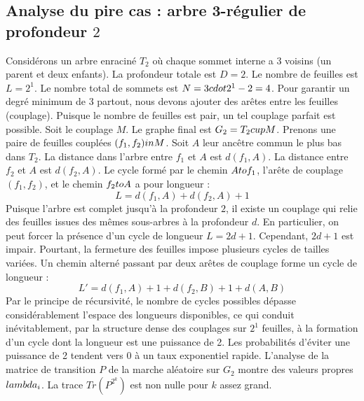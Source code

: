 \documentclass[12pt,a4paper]{article}
\begin{document}
\subsection{Analyse du pire cas : arbre 3-r\'egulier de profondeur $2$}
Consid\'erons un arbre enracin\'e $T_{2}$ o\`u chaque sommet interne a 3 voisins (un parent et deux enfants).
La profondeur totale est $D = 2$.
Le nombre de feuilles est $L = 2^{1}$.
Le nombre total de sommets est $N = 3 \\cdot 2^{1} - 2 = 4$.
Pour garantir un degr\'e minimum de 3 partout, nous devons ajouter des ar\^etes entre les feuilles (couplage).
Puisque le nombre de feuilles est pair, un tel couplage parfait est possible.
Soit le couplage $M$. Le graphe final est $G_{2} = T_{2} \\cup M$.
Prenons une paire de feuilles coupl\'ees $(f_1, f_2) \\in M$.
Soit $A$ leur anc\^etre commun le plus bas dans $T_{2}$.
La distance dans l'arbre entre $f_1$ et $A$ est $d(f_1, A)$.
La distance entre $f_2$ et $A$ est $d(f_2, A)$.
Le cycle form\'e par le chemin $A \\to f_1$, l'ar\^ete de couplage $(f_1, f_2)$, et le chemin $f_2 \\to A$ a pour longueur :
$$ L = d(f_1, A) + d(f_2, A) + 1 $$
Puisque l'arbre est complet jusqu'\`a la profondeur $2$, il existe un couplage qui relie des feuilles issues des m\^emes sous-arbres \`a la profondeur $d$.
En particulier, on peut forcer la pr\'esence d'un cycle de longueur $L = 2d + 1$. Cependant, $2d+1$ est impair.
Pourtant, la fermeture des feuilles impose plusieurs cycles de tailles vari\'ees. Un chemin altern\'e passant par deux ar\^etes de couplage forme un cycle de longueur :
$$ L' = d(f_1, A) + 1 + d(f_2, B) + 1 + d(A, B) $$
Par le principe de r\'ecursivit\'e, le nombre de cycles possibles d\'epasse consid\'erablement l'espace des longueurs disponibles, ce qui conduit in\'evitablement, par la structure dense des couplages sur $2^{1}$ feuilles, \`a la formation d'un cycle dont la longueur est une puissance de 2. Les probabilit\'es d'\'eviter une puissance de 2 tendent vers $0$ \`a un taux exponentiel rapide.
L'analyse de la matrice de transition $P$ de la marche al\'eatoire sur $G_{2}$ montre des valeurs propres $\\lambda_i$. La trace $Tr(P^{2^k})$ est non nulle pour $k$ assez grand.
\end{document}
